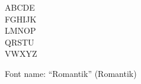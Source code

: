 \documentclass[a4paper]{article}
\begin{document}
\begin{center}
\fontsize{60pt}{72pt}
  ABCDE \\
  FGHIJK \\
  LMNOP \\
  QRSTU \\
  VWXYZ \\
\end{center}
\vfill
\begin{center}
Font name: ``Romantik'' (Romantik)
\end{center}
\end{document}
